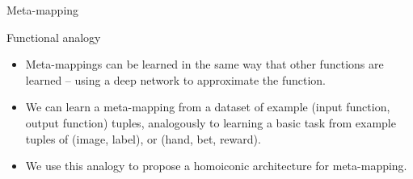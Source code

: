 \documentclass[final]{beamer}
\begin{document}
\begin{frame}[t]{}
\begin{columns}
\begin{column}[t]{0.248\textwidth}
\begin{block}{\huge Meta-mapping}
\end{block}
\begin{block}{\huge Functional analogy}
\vspace{-0.5em}
\begin{itemize}
\item Meta-mappings can be learned in the same way that other functions are learned -- using a deep network to approximate the function.
\item We can learn a meta-mapping from a dataset of example (input function, output function) tuples, analogously to learning a basic task from example tuples of (image, label), or (hand, bet, reward).
\item We use this analogy to propose a homoiconic architecture for meta-mapping.
\end{itemize}
\vspace{0.2em}
\end{block}
\end{column}


\end{columns}
\end{frame}
\end{document}
